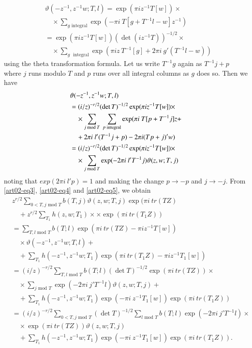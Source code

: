\begin{align*}
& \vartheta(-z^{-1},z^{-1}w; T,l)=\exp (\pi iz^{-1}T[w])\times\\
&\quad \times \sum_{g\text{~integral}}\exp(-\pi i\ T[g+T^{-1}l-w]z^{-1})\\
&= \exp (\pi iz^{-1}T[w])(\det(iz^{-1}T))^{-1/2}\times\\
&\quad \times \sum_{g\text{~ integral}}\exp(\pi iz\ T^{-1}[g]+2\pi i\
g'(T^{-1}l-w)) 
\end{align*}
using the theta transformation formula. Let us write $T^{-1}g$ again
as $T^{-1}j+p$ where $j$ runs modulo $T$ and $p$ runs over all
integral columns as $g$ does so. Then we have
\begin{align}
& \vartheta (-z^{-1},z^{-1}w; T,l)\notag\\
&=(i/z)^{-r/2}(\det T)^{-1/2}\exp(\pi iz^{-1}T[w])\times\notag\\
&\quad \times \sum_{j\text{~mod~}T} \ \sum_{p\text{~integral}} \exp
(\pi i\ T[p+T^{-1}j]z+\notag\\
&\quad +2\pi i\ l'(T^{-1}j+p)-2\pi i(Tp+j)'w)\notag\\
&=(i/z)^{-r/2}(\det T)^{-1/2}\exp (\pi iz^{-1}T[w])\times\notag\\
&\quad \times \sum_{j\text{~mod~}T}\exp(-2\pi i\ l'T^{-1}j)\vartheta(z,w;T,j)\label{art02-eq5}
\end{align}\pageoriginale 
noting that $exp(2\pi i\ l'p)=1$ and making the change $p\to -p$ and
$j\to -j$. From \eqref{art02-eq3}, \eqref{art02-eq4}
and \eqref{art02-eq5}, we obtain
\begin{align*}
& z^{r/2}\sum_{0<T,j\text{~mod~}T}b(T,j)\vartheta(z,w;T,j)\exp (\pi i\
tr(TZ)\\
&\quad +z^{r/2}\sum_{T_{1}}h(z,w;T_{1})\times\times \exp (\pi i\ tr(T_{1}Z))\\
&= \sum_{T,l\text{~mod~}T}b(T;l)\exp(\pi i\ tr(TZ)-\pi iz^{-1}T[w])\\
& \quad \times\vartheta (-z^{-1},z^{-1}w;T,l)+\\
&\quad + \sum_{T_{1}}h(-z^{-1},z^{-1}w;T_{1})\exp (\pi i\
tr(T_{1}Z)-\pi iz^{-1}T_{1}[w])\\
&= (i/z)^{-r/2}\sum_{T,l\text{~mod~}T}b(T;l)(\det T)^{-1/2}\exp(\pi i\
tr(TZ))\times \\
&\quad \times \sum_{j\text{~mod~}T}\exp(-2\pi i\
j'T^{-1}l)\vartheta(z,w;T,j)+\\
&\quad +\sum_{T_{1}}h(-z^{-1},z^{-1}w;T_{1})\exp (-\pi i\
z^{-1}T_{1}[w])\exp (\pi i\ tr(T_{1}Z))\\
&= (i/z)^{-r/2}\sum_{0<T,j\text{~mod~}T}(\det
T)^{-1/2}\sum_{l\text{~mod~}T}b(T;l)\exp(-2\pi i\ j'T^{-1}l)\times\\
&\quad \times \exp(\pi i\ tr(TZ))\vartheta(z,w;T,j)\\
&\quad +\sum_{T_{1}}h(-z^{-1},z^{-1}w;T_{1})\exp (-\pi i\
z^{-1}T_{1}[w])\exp(\pi i\ tr(T_{1}Z)).
\end{align*}
